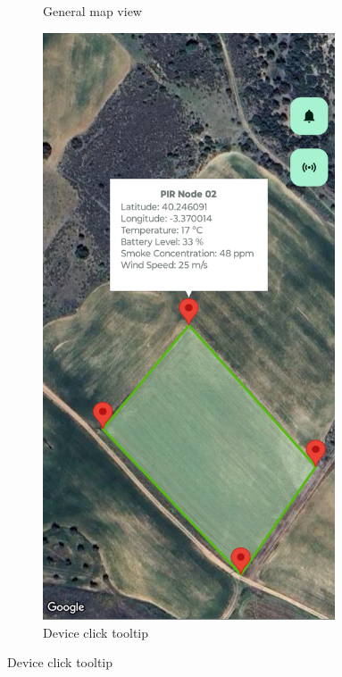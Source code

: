 \begin{enumerate}
\begin{figure}[H]
\begin{subfigure}[t]{0.4\textwidth}
                \caption{General map view}
            \end{subfigure}
            \begin{subfigure}[t]{0.3705\textwidth}
                \centering
                \includegraphics[width=0.95\textwidth]{images/8/05.png}
                \caption{Device click tooltip}
            \end{subfigure}

\end{figure}
\end{enumerate}
